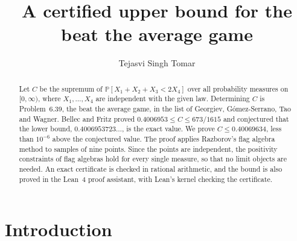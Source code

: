 \documentclass[11pt]{amsart}
\theoremstyle{definition}
\theoremstyle{remark}
\numberwithin{equation}{section}
\newcommand{\Prob}{\mathbb{P}}
\newcommand{\BOUNDD}{0.40069634}
\begin{document}
\title{A certified upper bound for the beat the average game}
\author{Tejasvi Singh Tomar}
\renewcommand{\urladdrname}{{\itshape ORCID}}

\begin{abstract}
Let $C$ be the supremum of $\Prob[X_1+X_2+X_3<2X_4]$ over all probability measures on $[0,\infty)$, where $X_1,\dots,X_4$ are independent with the given law. Determining $C$ is Problem~6.39, the beat the average game, in the list of Georgiev, G\'omez-Serrano, Tao and Wagner. Bellec and Fritz proved $0.4006953\le C\le 673/1615$ and conjectured that the lower bound, $0.4006953723\ldots$, is the exact value. We prove $C\le\BOUNDD$, less than $10^{-6}$ above the conjectured value. The proof applies Razborov's flag algebra method to samples of nine points. Since the points are independent, the positivity constraints of flag algebras hold for every single measure, so that no limit objects are needed. An exact certificate is checked in rational arithmetic, and the bound is also proved in the Lean~4 proof assistant, with Lean's kernel checking the certificate.
\end{abstract}

\maketitle

\section{Introduction}\label{sec:intro}
\enlargethispage{\baselineskip}
\end{document}
